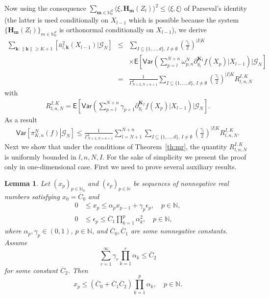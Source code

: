 \documentclass[aap,preprint]{imsart}
\newtheorem{lem}[thm]{Lemma}
\newcommand*{\ol}{\overline}
\begin{document}
Now using the consequence
$\sum_{\mathbf{m}\in \mathbb{N}^d_0} \langle\xi,\mathbf{H}_\mathbf{m}(Z_l)\rangle^2\le\langle\xi,\xi\rangle$
of Parseval's identity
(the latter is used conditionally on $X_{l-1}$
which is possible because the system
$\{\mathbf{H}_\mathbf{m}(Z_l)\}_{m\in \mathbb{N}^d_0}$
is orthonormal conditionally on $X_{l-1}$),
we derive
\begin{eqnarray*}
\sum_{\mathbf{k}\colon\|\mathbf{k}\|\geq K+1}\left[\bar{a}_{l,\mathbf{k}}^{2}(X_{l-1})|\mathcal{G}_{N}\right]
&\leq & \sum_{I\subseteq\{1,\ldots,d\},\, I\neq \emptyset}
\left(\frac{\gamma_{l}}{2}\right)^{|I|K}
\\
&& \times\mathsf E\left[
\mathsf{Var}\left(\sum_{p=l}^{N+n}\omega_{p,n}^{N}\partial_{y_{l}}^{\mathbf{K}_I}f\left(X_{p}\right)
\Big|X_{l-1}\right)
\Bigg|\mathcal G_N\right]
\\
&=& \frac{1}{\Gamma^2_{N+2,N+n+1}}\sum_{I\subseteq\{1,\ldots,d\},\, I\neq \emptyset}
\left(\frac{\gamma_{l}}{2}\right)^{|I|K}
R_{l,n,N}^{I,K}
\end{eqnarray*}
with
\begin{eqnarray*}
R_{l,n,N}^{I,K}=\mathsf E\left[
\mathsf{Var}\left(\sum_{p=l}^{N+n}\gamma_{p+1}\partial_{y_{l}}^{\mathbf{K}_I}f\left(X_{p}\right)
\Big|X_{l-1}\right)
\Bigg|\mathcal G_N\right].
\end{eqnarray*}
As a result
\begin{eqnarray*}
\mathsf{Var}\left[\left.\pi_{K,n}^{N}(f)\right|\mathcal G_N\right]\leq \frac{1}{\Gamma^2_{N+2,N+n+1}}\sum_{l=N+1}^{N+n}\sum_{I\subseteq\{1,\ldots,d\},\, I\neq \emptyset}
\left(\frac{\gamma_{l}}{2}\right)^{|I|K}
R_{l,n,N}^{I,K}.
\end{eqnarray*}
Next we show that under the conditions  of Theorem~\ref{th:mr}, the quantity \(R_{l,n,N}^{I,K}\) is uniformly bounded in \(l,n,N,I.\) For the sake of simplicity we present the proof only in one-dimensional case. First we need to prove several auxiliary results.
\begin{lem}\label{lem:06062018a1}
Let $(x_p)_{p\in\mathbb N_0}$
and $(\epsilon_p)_{p\in\mathbb N}$
be sequences of nonnegative real numbers
satisfying $x_0=\ol C_0$ and
\begin{align}
0&\le x_p\le\alpha_p x_{p-1}+\gamma_p \epsilon_p,\quad p\in\mathbb N,
\label{eq:06062018a1}\\
0&\le\epsilon_p\le\ol C_1\prod_{k=1}^p \alpha_k^2,\quad p\in\mathbb N,
\label{eq:06062018a2}
\end{align}
where $\alpha_p,\gamma_p\in(0,1)$, $p\in\mathbb N$,
and $\ol C_0,\ol C_1$ are some nonnegative constants. Assume
\begin{equation}\label{eq:06062018a3}
\sum_{r=1}^\infty\gamma_r \prod_{k=1}^r \alpha_k\le\ol C_2
\end{equation}
for some constant $\ol C_2$. Then
$$
x_p\le(\ol C_0+\ol C_1\ol C_2)\prod_{k=1}^p \alpha_k,\quad p\in\mathbb N.
$$
\end{lem}
\end{document}
